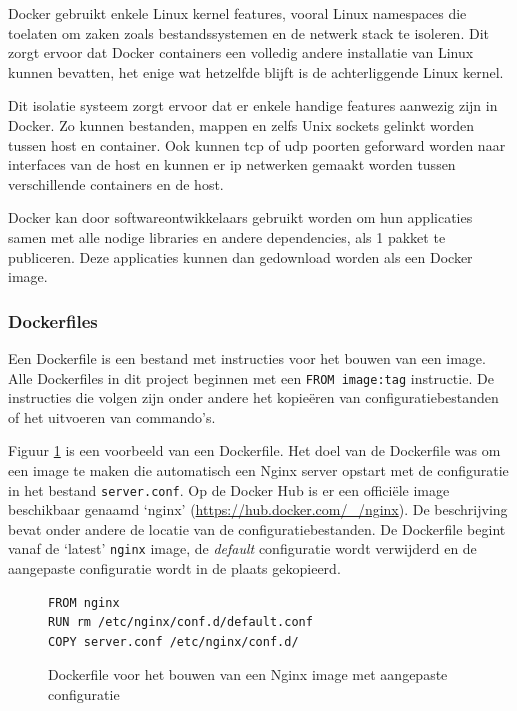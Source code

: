 \documentclass[a4paper,12pt]{report}
\begin{document}
Docker gebruikt enkele Linux kernel features, vooral Linux namespaces die toelaten om zaken zoals bestandssystemen en de netwerk stack te isoleren.
Dit zorgt ervoor dat Docker containers een volledig andere installatie van Linux kunnen bevatten, het enige wat hetzelfde blijft is de achterliggende Linux kernel.

Dit isolatie systeem zorgt ervoor dat er enkele handige features aanwezig zijn in Docker.
Zo kunnen bestanden, mappen en zelfs Unix sockets gelinkt worden tussen host en container.
Ook kunnen tcp of udp poorten geforward worden naar interfaces van de host en kunnen er ip netwerken gemaakt worden tussen verschillende containers en de host.

Docker kan door softwareontwikkelaars gebruikt worden om hun applicaties samen met alle nodige libraries en andere dependencies, als 1 pakket te publiceren.
Deze applicaties kunnen dan gedownload worden als een Docker image.
\autocite{docker:containers}

\subsubsection{Dockerfiles}
Een Dockerfile is een bestand met instructies voor het bouwen van een image.
Alle Dockerfiles in dit project beginnen met een \lstinline|FROM image:tag| instructie.
De instructies die volgen zijn onder andere het kopieëren van configuratiebestanden of het uitvoeren van commando's.
\autocite{docker:dockerfile}

Figuur \ref{fig:dockerfile-example} is een voorbeeld van een Dockerfile.
Het doel van de Dockerfile was om een image te maken die automatisch een Nginx server opstart met de configuratie in het bestand \lstinline|server.conf|.
Op de Docker Hub is er een officiële image beschikbaar genaamd `nginx' (\url{https://hub.docker.com/_/nginx}).
De beschrijving bevat onder andere de locatie van de configuratiebestanden.
De Dockerfile begint vanaf de `latest' \lstinline|nginx| image, de \emph{default} configuratie wordt verwijderd en de aangepaste configuratie wordt in de plaats gekopieerd.

\begin{figure}[H]
  \begin{lstlisting}
FROM nginx
RUN rm /etc/nginx/conf.d/default.conf
COPY server.conf /etc/nginx/conf.d/
  \end{lstlisting}
  \caption{Dockerfile voor het bouwen van een Nginx image met aangepaste configuratie}
  \label{fig:dockerfile-example}
\end{figure}
\end{document}
